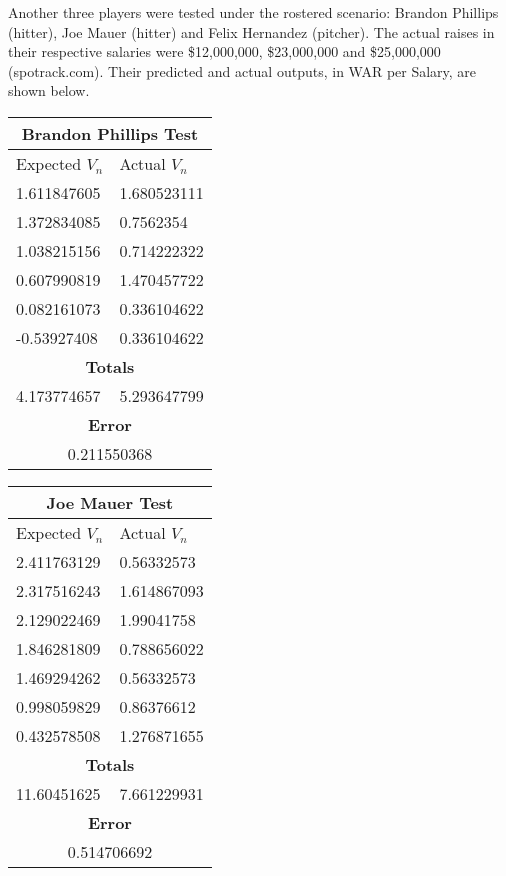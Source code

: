 \documentclass[12pt]{article}
\begin{document}
Another three players were tested under the rostered scenario: Brandon Phillips (hitter), Joe Mauer (hitter) and Felix Hernandez (pitcher).  The actual raises in their respective salaries were \$12,000,000, \$23,000,000 and \$25,000,000 (spotrack.com).  Their predicted and actual outputs, in WAR per Salary, are shown below.
\begin{center}
\begin{tabular}{ |p{2.5cm}||p{2cm}|  }
\hline
\multicolumn{2}{|c|}{Brandon Phillips Test} \\
\hline
Expected $V_n$ & Actual $V_n$ \\
\hline
 1.611847605 & 1.680523111   \\
\hline
1.372834085 &   0.7562354 \\
\hline
1.038215156 & 0.714222322  \\
\hline
0.607990819  & 1.470457722  \\
\hline
0.082161073 & 0.336104622  \\
 \hline
 -0.53927408 & 0.336104622  \\
 \hline
 \multicolumn{2}{|c|}{\textbf{Totals}} \\
 \hline
 4.173774657 & 5.293647799 \\
 \hline
 \multicolumn{2}{|c|}{\textbf{Error}} \\
 \hline
  \multicolumn{2}{|c|}{0.211550368} \\
 \hline
 \end{tabular}
\quad
\begin{tabular}{ |p{2.4cm}||p{2.5cm}|  }
\hline
\multicolumn{2}{|c|}{Joe Mauer Test} \\
\hline
Expected $V_n$ & Actual $V_n$ \\
\hline
 2.411763129 & 0.56332573   \\
\hline
2.317516243 &   1.614867093 \\
\hline
2.129022469 & 1.99041758  \\
\hline
1.846281809  & 0.788656022  \\
\hline
1.469294262 & 0.56332573  \\
 \hline
 0.998059829 & 0.86376612  \\
 \hline
 0.432578508 & 1.276871655  \\
 \hline
 \multicolumn{2}{|c|}{\textbf{Totals}} \\
 \hline
 11.60451625 & 7.661229931 \\
 \hline
 \multicolumn{2}{|c|}{\textbf{Error}} \\
 \hline
  \multicolumn{2}{|c|}{0.514706692} \\

\end{tabular}
\end{center}
\end{document}
